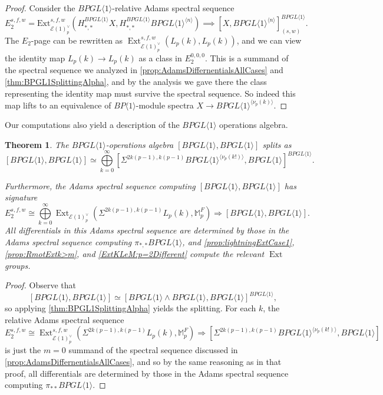 \documentclass{amsart}
\newtheorem{theorem}{Theorem}[section]
\theoremstyle{plain}
\numberwithin{theorem}{section}
\numberwithin{equation}{section}
\numberwithin{figure}{section}
\DeclareMathOperator{\Ext}{Ext}
\newcommand{\mM}{{\mathbb M}}
\newcommand{\cE}{{\mathcal E}}
\newcommand{\0}{\langle 0 \rangle }
\begin{document}
\begin{proof}
    Consider the $BPGL \langle 1 \rangle$-relative Adams spectral sequence
    \[E_2^{s,f,w} = \text{Ext}^{s,f,w}_{\mathcal{E}(1)^\vee_p}(H_{*,*}^{BPGL \langle 1 \rangle}X, H_{*,*}^{BPGL \langle 1 \rangle}BPGL \langle 1 \rangle^{\langle n \rangle}) \implies [X, BPGL \langle 1 \rangle^{\langle n \rangle}]^{BPGL \langle 1 \rangle}_{(s,w)}.\] The $E_2$-page can be rewritten as $\Ext_{\cE(1)_p^\vee}^{s,f,w}(L_p(k), L_p(k))$, and we can view the identity map $L_p(k) \to L_p(k)$ as a class in $E_2^{0,0,0}$. This is a summand of the spectral sequence we analyzed in \cref{prop:AdamsDiffernentialsAllCases} and \cref{thm:BPGL1SplittingAlpha}, and by the analysis we gave there the class representing the identity map must survive the spectral sequence. So indeed this map lifts to an equivalence of $BP\langle 1 \rangle$-module spectra $X \to BPGL\langle 1 \rangle^{\langle\nu_p(k)\rangle}$.
\end{proof}

Our computations also yield a description of the $BPGL\langle 1  \rangle$ operations algebra. 

\begin{theorem}\label{thm: operations}
    The $BPGL\langle 1 \rangle$-operations algebra $[BPGL\langle 1 \rangle, BPGL\langle 1 \rangle]$ splits as
    \[ [BPGL\langle 1 \rangle, BPGL\langle 1 \rangle] \simeq \bigoplus\limits_{k=0}^{\infty} [\Sigma^{2k(p-1), k(p-1)}BPGL\langle 1 \rangle^{\langle \nu_p(k!) \rangle}, BPGL\langle 1 \rangle]^{BPGL\langle 1 \rangle}.\]

    Furthermore, the Adams spectral sequence computing $[BPGL\langle 1 \rangle, BPGL\langle 1 \rangle]$ has signature 
    \[E_2^{s,f,w} \cong \bigoplus\limits_{k=0}^{\infty}\Ext_{\cE(1)^\vee_p}(\Sigma^{2k(p-1), k(p-1)}L_p(k), \mM_p^F)\Longrightarrow [BPGL\langle 1 \rangle, BPGL\langle 1 \rangle] .\]
    All differentials in this Adams spectral sequence are determined by those in the Adams spectral sequence computing $\pi_{*,*}BPGL\langle 1 \rangle$, and \cref{prop:lightningExtCase1}, \cref{prop:RmotExtk>m}, and \cref{ExtKLeM:p=2Different} compute the relevant $\Ext$ groups.
\end{theorem}

\begin{proof}
    Observe that \[ [BPGL\langle 1 \rangle, BPGL\langle 1 \rangle] \simeq [BPGL\langle 1 \rangle \wedge BPGL\langle 1 \rangle, BPGL\langle 1 \rangle]^{BPGL\langle 1 \rangle},\]
    so applying \cref{thm:BPGL1SplittingAlpha} yields the splitting. For each $k$, the relative Adams spectral sequence \[E_2^{s,f,w} \cong \Ext_{\cE(1)_p^\vee}^{s,f,w}(\Sigma^{2k(p-1), k(p-1)}L_p(k), \mM_p^F)\Longrightarrow [\Sigma^{2k(p-1), k(p-1)}BPGL\langle 1 \rangle^{\langle \nu_p(k!) \rangle}, BPGL\langle 1 \rangle] \] is just the $m=0$ summand of the spectral sequence discussed in \cref{prop:AdamsDiffernentialsAllCases}, and so by the same reasoning as in that proof, all differentials are determined by those in the Adams spectral sequence computing $\pi_{**}BPGL\langle 1 \rangle$.
\end{proof}
\end{document}
